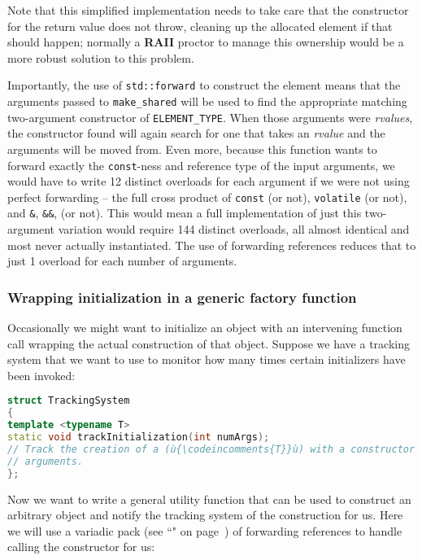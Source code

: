 \noindent Note that this simplified implementation needs to take care that the
constructor for the return value does not throw, cleaning up the
allocated element if that should happen; normally a \textbf{RAII}
proctor to manage this ownership would be a more robust solution to this
problem.

Importantly, the use of \texttt{std::forward} to construct the element
means that the arguments passed to \texttt{make\_shared} will be used to
find the appropriate matching two-argument constructor of
\texttt{ELEMENT\_TYPE}. When those arguments were \emph{rvalues}, the
constructor found will again search for one that takes an \emph{rvalue}
and the arguments will be moved from. Even more, because this function
wants to forward exactly the \texttt{const}-ness and reference type of
the input arguments, we would have to write 12 distinct overloads for
each argument if we were not using perfect forwarding -- the full cross
product of \texttt{const} (or not), \texttt{volatile} (or not), and
\texttt{\&}, \texttt{\&\&}, (or not). This would mean a full
implementation of just this two-argument variation would require 144
distinct overloads, all almost identical and most never actually
instantiated. The use of forwarding references reduces that to just 1
overload for each number of arguments.

\subsubsection[Wrapping initialization in a generic factory function]{Wrapping initialization in a generic factory function}\label{wrapping-initialization-in-a-generic-factory-function}

Occasionally we might want to initialize an object with an intervening
function call wrapping the actual construction of that object. Suppose
we have a tracking system that we want to use to monitor how many times
certain initializers have been invoked:

\begin{lstlisting}[language=C++]
struct TrackingSystem
{
template <typename T>
static void trackInitialization(int numArgs);
// Track the creation of a (ù{\codeincomments{T}}ù) with a constructor taking (ù{\codeincomments{numArgs}}ù)
// arguments.
};
\end{lstlisting}

\noindent Now we want to write a general utility function that can be used to
construct an arbitrary object and notify the tracking system of the
construction for us. Here we will use a variadic pack (see
``" on page~\pageref{variable-templates}) of forwarding references to handle
calling the constructor for us:

